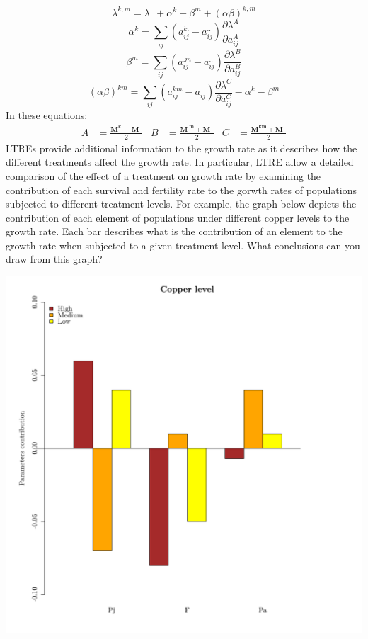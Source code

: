 \documentclass{article}\usepackage[]{graphicx}\usepackage[]{color}
\makeatletter
\def\maxwidth{ %
  \ifdim\Gin@nat@width>\linewidth
    \linewidth
  \else
    \Gin@nat@width
  \fi
}
\makeatother
\begin{document}
\begin{equation}\label{f}
\lambda^{k,m}=\lambda^{..}+\alpha^{k}+\beta^{m}+(\alpha \beta)^{k,m}
\end{equation}
\begin{equation}\label{e}
\alpha^{k}=\sum_{ij}(a^{k.}_{ij}-a^{..}_{ij}) \frac{\partial\lambda^{A}}{\partial a^{A}_{ij}}
\end{equation}
\begin{equation}
\beta^{m}=\sum_{ij}(a^{.m}_{ij}-a^{..}_{ij}) \frac{\partial\lambda^{B}}{\partial a^{B}_{ij}}
\end{equation}
\begin{equation}
(\alpha \beta)^{km}=\sum_{ij}(a^{km}_{ij}-a^{..}_{ij}) \frac{\partial\lambda^{C}}{\partial a^{C}_{ij}} -\alpha^{k}-\beta^{m}
\end{equation}
In these equations:
\begin{align}
A &= \frac{\boldsymbol{M^{k.}} + \boldsymbol{M^{..}}}{2} & B &= \frac{\boldsymbol{M^{.m}} + \boldsymbol{M^{..}}}{2} & C &= \frac{\boldsymbol{M^{km}} + \boldsymbol{M^{..}}}{2}
\end{align}
LTREs provide additional information to the growth rate as it describes how the different treatments affect the growth rate. In particular, LTRE allow a detailed comparison of the effect of a treatment on growth rate by examining the contribution of each survival and fertility rate to the gorwth rates of populations subjected to different treatment levels. For example, the graph below depicts the contribution of each element of populations under different copper levels to the growth rate. Each bar describes what is the contribution of an element to the growth rate when subjected to a given treatment level. What conclusions can you draw from this graph?





{\centering \includegraphics[width=\maxwidth]{figure/thypgraph-1} 

}
\end{document}
